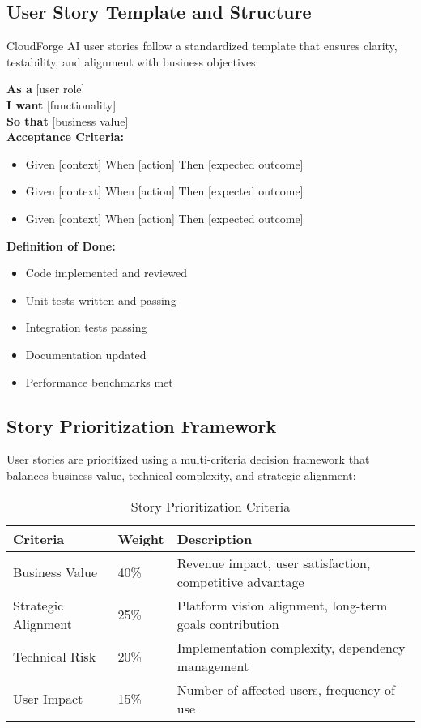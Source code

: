 \subsection{User Story Template and Structure}

CloudForge AI user stories follow a standardized template that ensures clarity, testability, and alignment with business objectives:

\begin{tcolorbox}[colback=lightgray, colframe=primaryblue, title=User Story Template]
\textbf{As a} [user role] \\
\textbf{I want} [functionality] \\
\textbf{So that} [business value] \\

\textbf{Acceptance Criteria:}
\begin{itemize}
    \item Given [context] When [action] Then [expected outcome]
    \item Given [context] When [action] Then [expected outcome]
    \item Given [context] When [action] Then [expected outcome]
\end{itemize}

\textbf{Definition of Done:}
\begin{itemize}
    \item Code implemented and reviewed
    \item Unit tests written and passing
    \item Integration tests passing
    \item Documentation updated
    \item Performance benchmarks met
\end{itemize}
\end{tcolorbox}

\subsection{Story Prioritization Framework}

User stories are prioritized using a multi-criteria decision framework that balances business value, technical complexity, and strategic alignment:

\begin{table}[H]
\centering
\caption{Story Prioritization Criteria}
\begin{tabular}{|p{3cm}|p{2cm}|p{7cm}|}
\hline
\textbf{Criteria} & \textbf{Weight} & \textbf{Description} \\
\hline
Business Value & 40\% & Revenue impact, user satisfaction, competitive advantage \\
\hline
Strategic Alignment & 25\% & Platform vision alignment, long-term goals contribution \\
\hline
Technical Risk & 20\% & Implementation complexity, dependency management \\
\hline
User Impact & 15\% & Number of affected users, frequency of use \\
\hline
\end{tabular}
\end{table}

